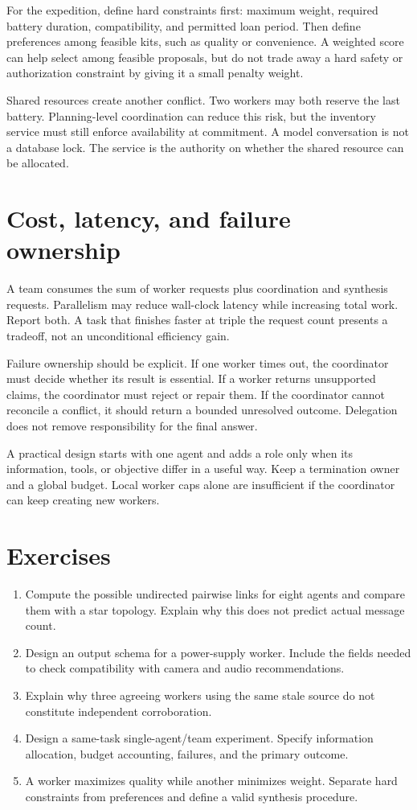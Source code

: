 For the expedition, define hard constraints first: maximum weight, required battery duration, compatibility, and permitted loan period. Then define preferences among feasible kits, such as quality or convenience. A weighted score can help select among feasible proposals, but do not trade away a hard safety or authorization constraint by giving it a small penalty weight.

Shared resources create another conflict. Two workers may both reserve the last battery. Planning-level coordination can reduce this risk, but the inventory service must still enforce availability at commitment. A model conversation is not a database lock. The service is the authority on whether the shared resource can be allocated.

\section{Cost, latency, and failure ownership}
A team consumes the sum of worker requests plus coordination and synthesis requests. Parallelism may reduce wall-clock latency while increasing total work. Report both. A task that finishes faster at triple the request count presents a tradeoff, not an unconditional efficiency gain.

Failure ownership should be explicit. If one worker times out, the coordinator must decide whether its result is essential. If a worker returns unsupported claims, the coordinator must reject or repair them. If the coordinator cannot reconcile a conflict, it should return a bounded unresolved outcome. Delegation does not remove responsibility for the final answer.

A practical design starts with one agent and adds a role only when its information, tools, or objective differ in a useful way. Keep a termination owner and a global budget. Local worker caps alone are insufficient if the coordinator can keep creating new workers.

\section{Exercises}
\begin{enumerate}
\item Compute the possible undirected pairwise links for eight agents and compare them with a star topology. Explain why this does not predict actual message count.
\item Design an output schema for a power-supply worker. Include the fields needed to check compatibility with camera and audio recommendations.
\item Explain why three agreeing workers using the same stale source do not constitute independent corroboration.
\item Design a same-task single-agent/team experiment. Specify information allocation, budget accounting, failures, and the primary outcome.
\item A worker maximizes quality while another minimizes weight. Separate hard constraints from preferences and define a valid synthesis procedure.
\end{enumerate}

